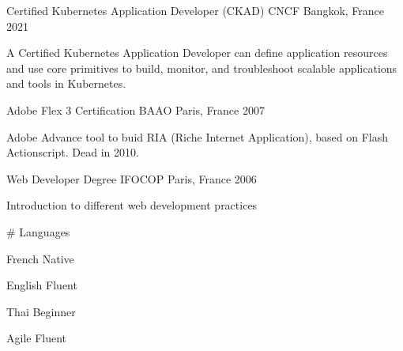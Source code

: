 

\begin{cventries}
  \cventry
    {Certified Kubernetes Application Developer (CKAD)} %
    {CNCF} %
    {Bangkok, France} %
    {2021} %
    {
      \begin{cvitems} %
        \item {A Certified Kubernetes Application Developer can define application resources and use core primitives to build, monitor, and troubleshoot scalable applications and tools in Kubernetes.}
      \end{cvitems}
    }
    { } %

  \cventry
    {Adobe Flex 3 Certification} %
    {BAAO} %
    {Paris, France} %
    {2007} %
    {
      \begin{cvitems} %
        \item {Adobe Advance tool to buid RIA (Riche Internet Application), based on Flash Actionscript. Dead in 2010.}
      \end{cvitems}
    }
    { } %
  \cventry
    {Web Developer Degree} %
    {IFOCOP} %
    {Paris, France} %
    {2006} %
    {
      \begin{cvitems} %
        \item {Introduction to different web development practices}
      \end{cvitems}
    }
    { } %

  \cventry
    {} %
    {\# Languages} %
    { } %
    { } %
    {
      \begin{cvitems} %
        \item {French Native}
        \item {English Fluent}
        \item {Thai Beginner}
        \item {Agile Fluent}
      \end{cvitems}
    }
    { } %

\end{cventries}
